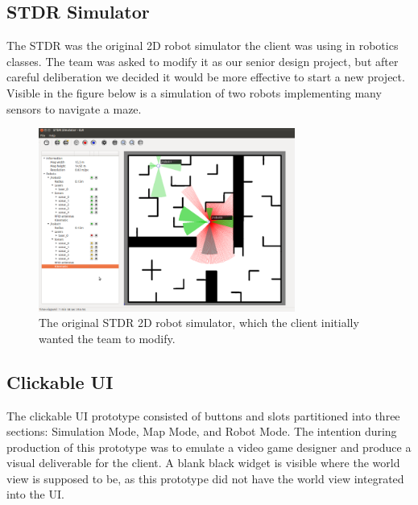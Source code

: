\subsection{STDR Simulator}

The STDR was the original 2D robot simulator the client was using in robotics classes. The team was asked to modify it as our senior design project, but after careful deliberation we decided it would be more effective to start a new project. Visible in the figure below is a simulation of two robots implementing many sensors to navigate a maze.

\begin{figure}[!htb]
	\begin{center}
		\includegraphics[width=0.75\textwidth]{./Images/Sprint0_STDR}
	\end{center}
	\caption{The original STDR 2D robot simulator, which the client initially wanted the team to modify.  \label{stdr}}
\end{figure}

\subsection{Clickable UI}

The clickable UI prototype consisted of buttons and slots partitioned into three sections: Simulation Mode, Map Mode, and Robot Mode. The intention during production of this prototype was to emulate a video game designer and produce a visual deliverable for the client. A blank black widget is visible where the world view is supposed to be, as this prototype did not have the world view integrated into the UI.\newline\newline\newline
\newline\newline\newline
\newline\newline\newline

